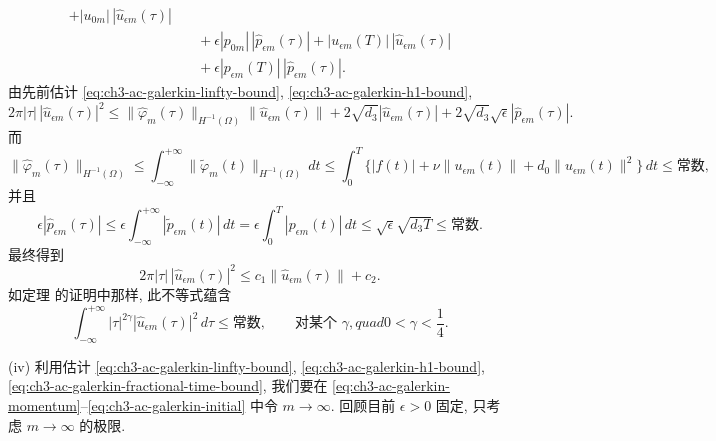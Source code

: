 \begin{Proof}
\[\begin{aligned}
+|u_{0m}|\,|\widehat u_{\epsilon m}(\tau)|\\
&\quad+\epsilon|p_{0m}|\,|\widehat p_{\epsilon m}(\tau)|
+|u_{\epsilon m}(T)|\,|\widehat u_{\epsilon m}(\tau)|\\
&\quad+\epsilon|p_{\epsilon m}(T)|\,|\widehat p_{\epsilon m}(\tau)|.
\end{aligned}
\]
由先前估计 \eqref{eq:ch3-ac-galerkin-linfty-bound}, \eqref{eq:ch3-ac-galerkin-h1-bound},
\[
2\pi|\tau|\,|\widehat u_{\epsilon m}(\tau)|^2
\leq\lVert\widehat\varphi_m(\tau)\rVert_{H^{-1}(\Omega)}
\lVert\widehat u_{\epsilon m}(\tau)\rVert
+2\sqrt{d_3}|\widehat u_{\epsilon m}(\tau)|
+2\sqrt{d_3}\sqrt\epsilon|\widehat p_{\epsilon m}(\tau)|.
\]
而
\[
\lVert\widehat\varphi_m(\tau)\rVert_{H^{-1}(\Omega)}
\leq\int_{-\infty}^{+\infty}
\lVert\widetilde\varphi_m(t)\rVert_{H^{-1}(\Omega)}\,dt
\leq\int_0^T\{|f(t)|+\nu\lVert u_{\epsilon m}(t)\rVert
+d_0\lVert u_{\epsilon m}(t)\rVert^2\}\,dt
\leq\text{常数},
\]
并且
\[
\epsilon|\widehat p_{\epsilon m}(\tau)|
\leq\epsilon\int_{-\infty}^{+\infty}|\widetilde p_{\epsilon m}(t)|\,dt
=\epsilon\int_0^T|p_{\epsilon m}(t)|\,dt
\leq\sqrt\epsilon\sqrt{d_3T}
\leq\text{常数}.
\]
最终得到
\begin{equation}
2\pi|\tau|\,|\widehat u_{\epsilon m}(\tau)|^2
\leq c_1\lVert\widehat u_{\epsilon m}(\tau)\rVert+c_2.
\label{eq:ch3-ac-galerkin-fourier-pointwise}
\end{equation}
如定理  的证明中那样, 此不等式蕴含
\begin{equation}
\int_{-\infty}^{+\infty}|\tau|^{2\gamma}
|\widehat u_{\epsilon m}(\tau)|^2\,d\tau
\leq\text{常数},
\qquad\text{对某个 }\gamma,quad0<\gamma<\frac14.
\label{eq:ch3-ac-galerkin-fractional-time-bound}
\end{equation}

\hypertarget{chapter-03-page-309}{}
(iv) 利用估计 \eqref{eq:ch3-ac-galerkin-linfty-bound}, \eqref{eq:ch3-ac-galerkin-h1-bound}, \eqref{eq:ch3-ac-galerkin-fractional-time-bound}, 我们要在 \eqref{eq:ch3-ac-galerkin-momentum}--\eqref{eq:ch3-ac-galerkin-initial} 中令 $m\to\infty$. 回顾目前 $\epsilon>0$ 固定, 只考虑 $m\to\infty$ 的极限.


\end{Proof}
